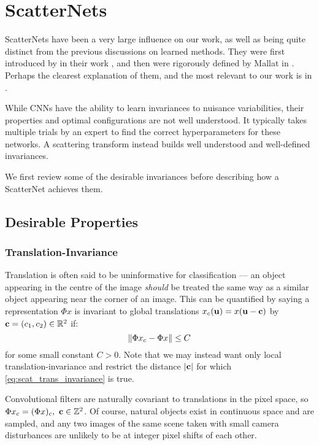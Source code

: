 \section{ScatterNets}\label{sec:ch2:scatternets}
  ScatterNets have been a very large influence on
  our work, as well as being quite distinct from the previous discussions on
  learned methods. They were first introduced by
  \citeauthor{bruna_classification_2011} in their work
  \cite{bruna_classification_2011}, and then were rigorously defined by Mallat
  in \cite{mallat_group_2012}. Perhaps the clearest explanation of them, and the most
  relevant to our work is in \cite{bruna_invariant_2013}.

  While CNNs have the ability to learn invariances to nuisance variabilities,
  their properties and optimal configurations are not well understood.
  It typically takes multiple trials
  by an expert to find the correct hyperparameters for these networks. A
  scattering transform instead builds well understood and well-defined invariances.

  We first review some of the desirable invariances before describing how a
  ScatterNet achieves them.

\subsection{Desirable Properties}
\subsubsection{Translation-Invariance}
  Translation is often said to be uninformative for classification --- an
  object appearing in the centre of the image \emph{should} be treated the same way as
  a similar object appearing near the corner of an image. This can be quantified
  by saying a representation $\Phi x$ is invariant to global translations $x_c(\mathbf{u}) =
  x(\mathbf{u}-\mathbf{c})$ by $\mathbf{c}=(c_1,c_2) \in \mathbb{R}^2$ if:
  \begin{equation}\label{eq:scat_trans_invariance}
    \left\lVert \Phi x_c - \Phi x \right\rVert \leq C
  \end{equation}
  for some small constant $C>0$.
  Note that we may instead want only local translation-invariance and
  restrict the distance $|\mathbf{c}|$ for which \eqref{eq:scat_trans_invariance}
  is true.

  Convolutional filters are naturally covariant to translations in the pixel space,
  so $\Phi x_c = (\Phi x)_c,\ \bmu{c} \in \mathbb{Z}^2$. Of course, natural objects
  exist in continuous space and are sampled, and any two images of the same
  scene taken with small camera disturbances are unlikely to be at integer pixel
  shifts of each other.

